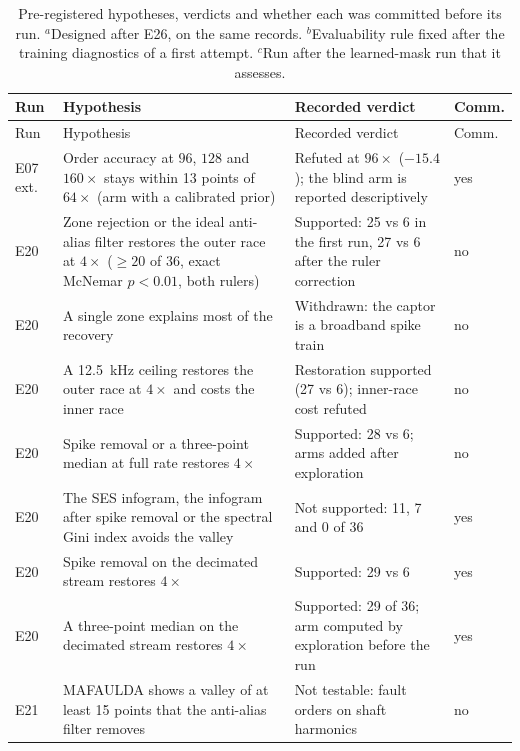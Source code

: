 {\footnotesize
\begin{longtable}{@{}>{\raggedright\arraybackslash}p{}%
  >{\raggedright\arraybackslash}p{}%
  >{\raggedright\arraybackslash}p{}p{}@{}}
\caption{Pre-registered hypotheses, verdicts and whether each was committed before its run.
$^a$Designed after E26, on the same records. $^b$Evaluability rule fixed after the training
diagnostics of a first attempt. $^c$Run after the learned-mask run that it assesses.}
\label{tab:ledger}\\
\toprule
Run & Hypothesis & Recorded verdict & Comm.\\
\midrule
\endfirsthead
\toprule
Run & Hypothesis & Recorded verdict & Comm.\\
\midrule
\endhead
\bottomrule
\endfoot
E07 ext. & Order accuracy at $96$, $128$ and $160\times$ stays within 13 points of $64\times$
  (arm with a calibrated prior) & Refuted at $96\times$ ($-15.4$); the blind arm is reported
  descriptively & yes \\
E20 & Zone rejection or the ideal anti-alias filter restores the outer race at $4\times$
  ($\geq 20$ of 36, exact McNemar $p < 0.01$, both rulers) & Supported: 25 vs 6 in the first run, 27
  vs 6 after the ruler correction & no \\
E20 & A single zone explains most of the recovery & Withdrawn: the captor is a broadband spike
  train & no \\
E20 & A 12.5~kHz ceiling restores the outer race at $4\times$ and costs the inner race &
  Restoration supported (27 vs 6); inner-race cost refuted & no \\
E20 & Spike removal or a three-point median at full rate restores $4\times$ & Supported: 28 vs 6;
  arms added after exploration & no \\
E20 & The SES infogram, the infogram after spike removal or the spectral Gini index avoids the
  valley & Not supported: 11, 7 and 0 of 36 & yes \\
E20 & Spike removal on the decimated stream restores $4\times$ & Supported: 29 vs 6 & yes \\
E20 & A three-point median on the decimated stream restores $4\times$ & Supported: 29 of 36; arm
  computed by exploration before the run & yes \\
E21 & MAFAULDA shows a valley of at least 15 points that the anti-alias filter removes & Not
  testable: fault orders on shaft harmonics & no \\

\end{longtable}}
